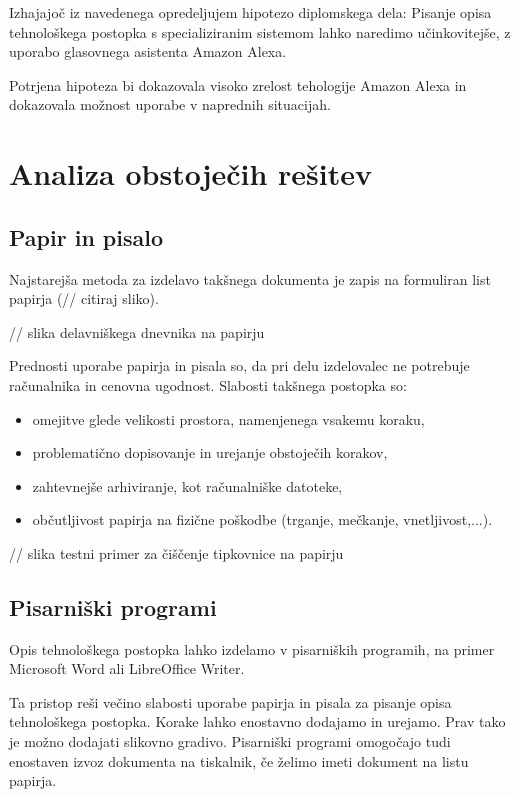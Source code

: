 \documentclass[a4paper, 12pt]{book}
\begin{document}
Izhajajoč iz navedenega opredeljujem hipotezo diplomskega dela: Pisanje opisa tehnološkega postopka s specializiranim sistemom lahko naredimo učinkovitejše, z uporabo glasovnega asistenta Amazon Alexa.

Potrjena hipoteza bi dokazovala visoko zrelost tehologije Amazon Alexa in dokazovala možnost uporabe v naprednih situacijah.

\section{Analiza obstoječih rešitev}

\subsection{Papir in pisalo}

Najstarejša metoda za izdelavo takšnega dokumenta je zapis na formuliran list papirja (// citiraj sliko).

// slika delavniškega dnevnika na papirju

Prednosti uporabe papirja in pisala so, da pri delu izdelovalec ne potrebuje računalnika in cenovna ugodnost.
Slabosti takšnega postopka so:
\begin{itemize}
	\item omejitve glede velikosti prostora, namenjenega vsakemu koraku,
	\item problematično dopisovanje in urejanje obstoječih korakov,
	\item zahtevnejše arhiviranje, kot računalniške datoteke,
	\item občutljivost papirja na fizične poškodbe (trganje, mečkanje, vnetljivost,...).
\end{itemize}

// slika testni primer za čiščenje tipkovnice na papirju

\subsection{Pisarniški programi}

Opis tehnološkega postopka lahko izdelamo v pisarniških programih, na primer Microsoft Word ali LibreOffice Writer.

Ta pristop reši večino slabosti uporabe papirja in pisala za pisanje opisa tehnološkega postopka.
Korake lahko enostavno dodajamo in urejamo.
Prav tako je možno dodajati slikovno gradivo.
Pisarniški programi omogočajo tudi enostaven izvoz dokumenta na tiskalnik, če želimo imeti dokument na listu papirja.
\end{document}
